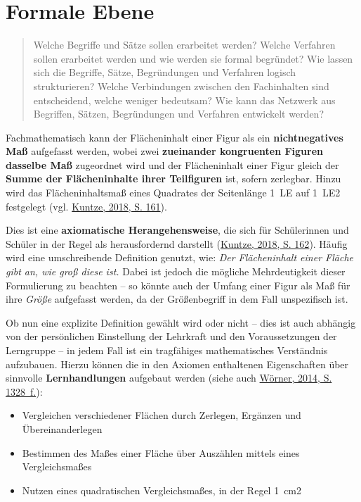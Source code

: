 \documentclass[
]{scrbook}
\providecommand{\tightlist}{%
  \setlength{\itemsep}{0pt}\setlength{\parskip}{0pt}}
\theoremstyle{definition}
\theoremstyle{definition}
\theoremstyle{definition}
\theoremstyle{definition}
\theoremstyle{remark}
\begin{document}
\hypertarget{formale-ebene-1}{%
\section{Formale Ebene}\label{formale-ebene-1}}

\begin{quote}
Welche Begriffe und Sätze sollen erarbeitet werden?
Welche Verfahren sollen erarbeitet werden und wie werden sie formal begründet?
Wie lassen sich die Begriffe, Sätze, Begründungen und Verfahren logisch strukturieren?
Welche Verbindungen zwischen den Fachinhalten sind entscheidend, welche weniger bedeutsam?
Wie kann das Netzwerk aus Begriffen, Sätzen, Begründungen und Verfahren entwickelt werden?
\end{quote}

Fachmathematisch kann der Flächeninhalt einer Figur als ein \textbf{nichtnegatives Maß} aufgefasst werden, wobei zwei \textbf{zueinander kongruenten Figuren dasselbe Maß} zugeordnet wird und der Flächeninhalt einer Figur gleich der \textbf{Summe der Flächeninhalte ihrer Teilfiguren} ist, sofern zerlegbar. Hinzu wird das Flächeninhaltsmaß eines Quadrates der Seitenlänge 1~LE auf 1~LE2 festgelegt (vgl. \protect\hyperlink{ref-Kuntze2018}{Kuntze, 2018, S. 161}).

Dies ist eine \textbf{axiomatische Herangehensweise}, die sich für Schülerinnen und Schüler in der Regel als herausfordernd darstellt (\protect\hyperlink{ref-Kuntze2018}{Kuntze, 2018, S. 162}). Häufig wird eine umschreibende Definition genutzt, wie: \emph{Der Flächeninhalt einer Fläche gibt an, wie groß diese ist.} Dabei ist jedoch die mögliche Mehrdeutigkeit dieser Formulierung zu beachten -- so könnte auch der Umfang einer Figur als Maß für ihre \emph{Größe} aufgefasst werden, da der Größenbegriff in dem Fall unspezifisch ist.

Ob nun eine explizite Definition gewählt wird oder nicht -- dies ist auch abhängig von der persönlichen Einstellung der Lehrkraft und den Voraussetzungen der Lerngruppe -- in jedem Fall ist ein tragfähiges mathematisches Verständnis aufzubauen. Hierzu können die in den Axiomen enthaltenen Eigenschaften über sinnvolle \textbf{Lernhandlungen} aufgebaut werden (siehe auch \protect\hyperlink{ref-Worner2014}{Wörner, 2014, S. 1328~f.}):

\begin{itemize}
\tightlist
\item
  Vergleichen verschiedener Flächen durch Zerlegen, Ergänzen und Übereinanderlegen
\item
  Bestimmen des Maßes einer Fläche über Auszählen mittels eines Vergleichsmaßes
\item
  Nutzen eines quadratischen Vergleichsmaßes, in der Regel 1~cm2
\end{itemize}
\end{document}
